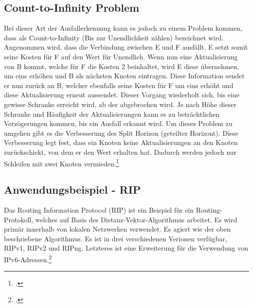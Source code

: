 \subsection{Count-to-Infinity Problem}
Bei dieser Art der Ausfallerkennung kann es jedoch zu einem Problem kommen, dass als Count-to-Infinity (Bis zur Unendlichkeit zählen) bezeichnet wird. Angenommen wird, dass die Verbindung zwischen E und F ausfällt. E setzt somit seine Kosten für F auf den Wert für Unendlich. Wenn nun eine Aktualisierung von B kommt, welche für F die Kosten 2 beinhaltet, wird E diese übernehmen, um eins erhöhen und B als nächsten Knoten eintragen. Diese Information sendet er nun zurück an B, welcher ebenfalls seine Kosten für F um eins erhöht und diese Aktualisierung erneut aussendet. Dieser Vorgang wiederholt sich, bis eine gewisse Schranke erreicht wird, ab der abgebrochen wird. Je nach Höhe dieser Schranke und Häufigkeit der Aktualisierungen kann es zu beträchtlichen Verzögerungen kommen, bis ein Ausfall erkannt wird. Um dieses Problem zu umgehen gibt es die Verbesserung des Split Horizon (geteilter Horizont). Diese Verbesserung legt fest, dass ein Knoten keine Aktualisierungen an den Knoten zurückschickt, von dem er den Wert erhalten hat. Dadurch werden jedoch nur Schleifen mit zwei Knoten vermieden.\footcite{distsys1}

\subsection{Anwendungsbeispiel - RIP}
Das Routing Information Protocol (RIP) ist ein Beispiel für ein Routing-Protokoll, welches auf Basis des Distanz-Vektor-Algorithmus arbeitet. Es wird primär innerhalb von lokalen Netzwerken verwendet. Es agiert wie der oben beschriebene Algorithmus. Es ist in drei verschiedenen Verionen verfügbar, RIPv1, RIPv2 und RIPng. Letzteres ist eine Erweiterung für die Verwendung von IPv6-Adressen.\footcite{rip-wiki}